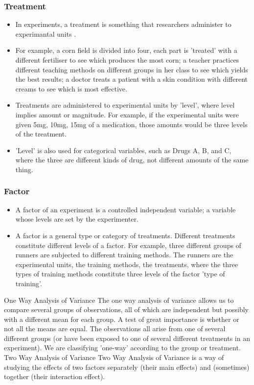 \subsubsection*{Treatment}
\begin{itemize}
\item In experiments, a treatment is something that researchers administer to experimantal units . 
\item For example, a corn field is divided into four, each part is 'treated' with a different fertiliser to see which produces the most corn; a teacher practices different teaching methods on different groups in her class to see which yields the best results; a doctor treats a patient with a skin condition with different creams to see which is most effective.
\item Treatments are administered to experimental units by 'level', where level implies amount or magnitude. For example, if the experimental units were given 5mg, 10mg, 15mg of a medication, those amounts would be three levels of the treatment. 
\item 'Level' is also used for categorical variables, such as Drugs A, B, and C, where the three are different kinds of drug, not different amounts of the same thing.
\end{itemize}
\subsubsection*{Factor}
\begin{itemize}
\item A factor of an experiment is a controlled independent variable; a variable whose levels are set by the experimenter.
\item A factor is a general type or category of treatments. Different treatments constitute different levels of a factor. For example, three different groups of runners are subjected to different training methods. The runners are the experimental units, the training methods, the treatments, where the three types of training methods constitute three levels of the factor 'type of training'.

\end{itemize}

One Way Analysis of Variance 
The one way analysis of variance allows us to compare several groups of observations, all of which are independent but possibly with a different mean for each group. A test of great importance is whether or not all the means are equal.
The observations all arise from one of several different groups (or have been exposed to one of several different treatments in an experiment). We are classifying 'one-way' according to the group or treatment.
Two Way Analysis of Variance 
Two Way Analysis of Variance is a way of studying the effects of two factors separately (their main effects) and (sometimes) together (their interaction effect).

